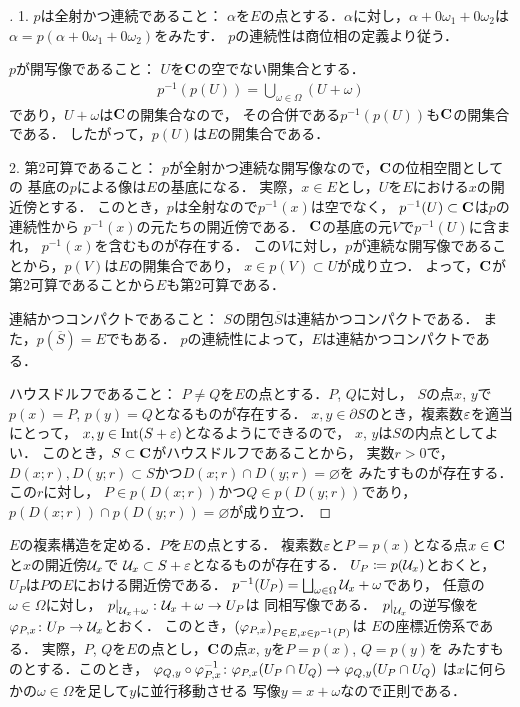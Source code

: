 \begin{proof}[\pfb]
    1. 
    $p$は全射かつ連続であること：
    $\alpha$を$E$の点とする．$\alpha$に対し，$\alpha+0\omega_1+0\omega_2$は
    $\alpha=p(\alpha+0\omega_1+0\omega_2)$をみたす．
    $p$の連続性は商位相の定義より従う．

    $p$が開写像であること：
    $U$を$\mathbf{C}$の空でない開集合とする．
    \begin{align*}
        p^{-1}(p(U))=\bigcup_{\omega\in\Omega}(U+\omega)
    \end{align*}
    であり，$U+\omega$は$\mathbf{C}$の開集合なので，
    その合併である$p^{-1}(p(U))$も$\mathbf{C}$の開集合である．
    したがって，$p(U)$は$E$の開集合である．

    2. 
    第2可算であること：
    $p$が全射かつ連続な開写像なので，$\mathbf{C}$の位相空間としての
    基底の$p$による像は$E$の基底になる．
    実際，$x\in E$とし，$U$を$E$における$x$の開近傍とする．
    このとき，$p$は全射なので$p^{-1}(x)$は空でなく，
    $p^{-1}(U)\subset \mathbf{C}$は$p$の連続性から
    $p^{-1}(x)$の元たちの開近傍である．
    $\mathbf{C}$の基底の元$V$で$p^{-1}(U)$に含まれ，
    $p^{-1}(x)$を含むものが存在する．
    この$V$に対し，$p$が連続な開写像であることから，$p(V)$は$E$の開集合であり，
    $x\in p(V)\subset U$が成り立つ．
    よって，$\mathbf{C}$が第2可算であることから$E$も第2可算である．
    
    連結かつコンパクトであること：
    $S$の閉包$\overline{S}$は連結かつコンパクトである．
    また，$p(\overline{S})=E$でもある．
    $p$の連続性によって，$E$は連結かつコンパクトである．

    ハウスドルフであること：
    $P\neq Q$を$E$の点とする．$P$, $Q$に対し，
    $S$の点$x$, $y$で
    $p(x)=P$, $p(y)=Q$となるものが存在する．
    $x,y\in \partial S$のとき，複素数$\varepsilon$を適当にとって，
    $x,y\in\mathop{\mathrm{Int}}\nolimits(S+\varepsilon)$となるようにできるので，
    $x$, $y$は$S$の内点としてよい．
    このとき，$S\subset\mathbf{C}$がハウスドルフであることから，
    実数$r>0$で，
    $D(x;r), D(y;r)\subset S$かつ$D(x;r)\cap D(y;r)=\varnothing$を
    みたすものが存在する．この$r$に対し，
    $P\in p(D(x;r))$かつ$Q\in p(D(y;r))$であり，
    $p(D(x;r))\cap p(D(y;r))=\varnothing$が成り立つ．
\end{proof}

$E$の複素構造を定める．$P$を$E$の点とする．
複素数$\varepsilon$と$P=p(x)$となる点$x\in \mathbf{C}$と$x$の開近傍$\mathcal{U}_x$で
$\mathcal{U}_x\subset S+\varepsilon$となるものが存在する．
$U_P\coloneqq p(\mathcal{U}_x)$とおくと，
$U_P$は$P$の$E$における開近傍である．
$p^{-1}(U_P)=\bigsqcup_{\omega\in\Omega}\mathcal{U}_x+\omega$であり，
任意の$\omega\in\Omega$に対し，
$\left. p \right|_{\mathcal{U}_x+\omega}\colon \mathcal{U}_x+\omega\to U_P$は
同相写像である．
$\left. p \right|_{\mathcal{U}_x}$の逆写像を$\varphi_{P,x}\colon U_P\to\mathcal{U}_x$とおく．
このとき，$\left(\varphi_{P,x}\right)_{P\in E, x\in p^{-1}(P)}$は
$E$の座標近傍系である．
実際，$P$, $Q$を$E$の点とし，$\mathbf{C}$の点$x$, $y$を$P=p(x)$, $Q=p(y)$を
みたすものとする．このとき，
$\varphi_{Q,y}\circ \varphi_{P,x}^{-1}\colon \varphi_{P,x}(U_P\cap U_Q)\to\varphi_{Q,y}(U_P\cap U_Q)$
は$x$に何らかの$\omega\in\Omega$を足して$y$に並行移動させる
写像$y=x+\omega$なので正則である．

